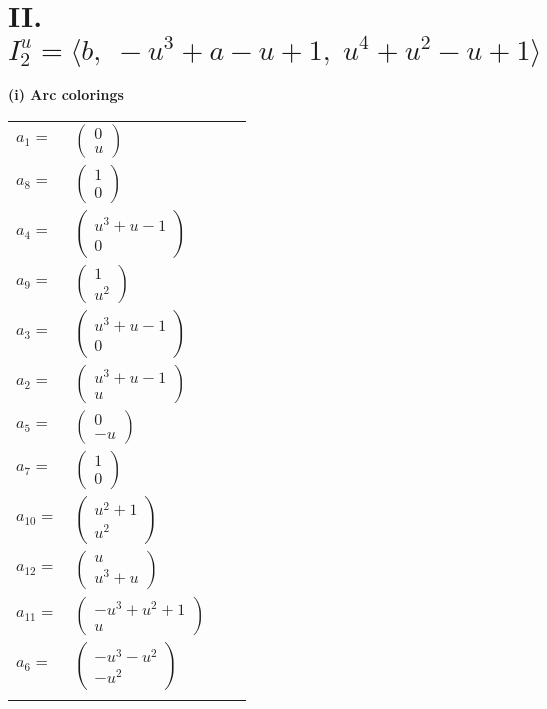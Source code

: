 \documentclass[1p]{elsarticle_modified}
\theoremstyle{definition}
\begin{document}
\centering \section*{II. $I^u_{2}= \langle b,\;- u^3+a- u+1,\;u^4+u^2- u+1 \rangle$}
\flushleft \textbf{(i) Arc colorings}\\
\begin{tabular}{m{7pt} m{180pt} m{7pt} m{180pt} }
\flushright $a_{1}=$&$\begin{pmatrix}0\\u\end{pmatrix}$ \\
\flushright $a_{8}=$&$\begin{pmatrix}1\\0\end{pmatrix}$ \\
\flushright $a_{4}=$&$\begin{pmatrix}u^3+u-1\\0\end{pmatrix}$ \\
\flushright $a_{9}=$&$\begin{pmatrix}1\\u^2\end{pmatrix}$ \\
\flushright $a_{3}=$&$\begin{pmatrix}u^3+u-1\\0\end{pmatrix}$ \\
\flushright $a_{2}=$&$\begin{pmatrix}u^3+u-1\\u\end{pmatrix}$ \\
\flushright $a_{5}=$&$\begin{pmatrix}0\\- u\end{pmatrix}$ \\
\flushright $a_{7}=$&$\begin{pmatrix}1\\0\end{pmatrix}$ \\
\flushright $a_{10}=$&$\begin{pmatrix}u^2+1\\u^2\end{pmatrix}$ \\
\flushright $a_{12}=$&$\begin{pmatrix}u\\u^3+u\end{pmatrix}$ \\
\flushright $a_{11}=$&$\begin{pmatrix}- u^3+u^2+1\\u\end{pmatrix}$ \\
\flushright $a_{6}=$&$\begin{pmatrix}- u^3- u^2\\- u^2\end{pmatrix}$\\&\end{tabular}
\end{document}
